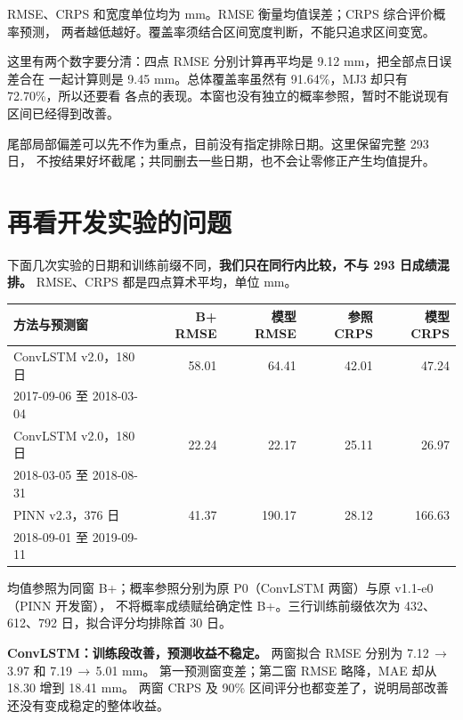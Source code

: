 \documentclass[UTF8,zihao=-4]{ctexart}
\newcommand{\change}[2]{\mbox{#1\,$\rightarrow$\,#2}}
\begin{document}
{\small RMSE、CRPS 和宽度单位均为 mm。RMSE 衡量均值误差；CRPS 综合评价概率预测，
两者越低越好。覆盖率须结合区间宽度判断，不能只追求区间变宽。}

这里有两个数字要分清：四点 RMSE 分别计算再平均是 9.12 mm，把全部点日误差合在
一起计算则是 9.45 mm。总体覆盖率虽然有 91.64\%，MJ3 却只有 72.70\%，所以还要看
各点的表现。本窗也没有独立的概率参照，暂时不能说现有区间已经得到改善。

尾部局部偏差可以先不作为重点，目前没有指定排除日期。这里保留完整 293 日，
不按结果好坏截尾；共同删去一些日期，也不会让零修正产生均值提升。

\clearpage

\section{再看开发实验的问题}

下面几次实验的日期和训练前缀不同，\textbf{我们只在同行内比较，不与 293 日成绩混排。}
RMSE、CRPS 都是四点算术平均，单位 mm。

\begin{center}
\small
\setlength{\tabcolsep}{3.5pt}
\begin{tabularx}{\textwidth}{@{}Yrrrr@{}}
\toprule
方法与预测窗 & B+ RMSE & 模型 RMSE & 参照 CRPS & 模型 CRPS \\
\midrule
ConvLSTM v2.0，180 日 & 58.01 & 64.41 & 42.01 & 47.24 \\
{\footnotesize 2017-09-06 至 2018-03-04} & & & & \\
\addlinespace[0.3em]
ConvLSTM v2.0，180 日 & 22.24 & 22.17 & 25.11 & 26.97 \\
{\footnotesize 2018-03-05 至 2018-08-31} & & & & \\
\addlinespace[0.3em]
PINN v2.3，376 日 & 41.37 & 190.17 & 28.12 & 166.63 \\
{\footnotesize 2018-09-01 至 2019-09-11} & & & & \\
\bottomrule
\end{tabularx}
\end{center}

{\small 均值参照为同窗 B+；概率参照分别为原 P0（ConvLSTM 两窗）与原 v1.1-e0（PINN 开发窗），
不将概率成绩赋给确定性 B+。三行训练前缀依次为 432、612、792 日，拟合评分均排除首 30 日。}

\textbf{ConvLSTM：训练段改善，预测收益不稳定。}
两窗拟合 RMSE 分别为 \change{7.12}{3.97} 和 \change{7.19}{5.01} mm。
第一预测窗变差；第二窗 RMSE 略降，MAE 却从 18.30 增到 18.41 mm。
两窗 CRPS 及 90\% 区间评分也都变差了，说明局部改善还没有变成稳定的整体收益。
\end{document}
